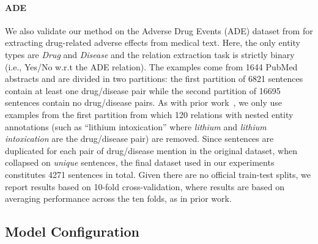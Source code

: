 \documentclass{clv3}
\begin{document}
\paragraph{ADE} We also validate our method on the Adverse Drug Events (ADE) dataset from  for extracting drug-related adverse effects from medical text. Here, the only entity types are \emph{Drug} and \emph{Disease} and the relation extraction task is strictly binary (i.e., Yes/No w.r.t the ADE relation). The examples come from 1644 PubMed abstracts and are divided in two partitions: the first partition of 6821 sentences contain at least one drug/disease pair while the second partition of 16695 sentences contain no drug/disease pairs. As with prior work~\cite{li2016joint,li2017neural,bekoulis2018join,bekoulis2018adversarial}, we  only use examples from the first partition from which  120 relations with nested entity annotations (such as ``lithium intoxication'' where \emph{lithium} and \emph{lithium intoxication} are the drug/disease pair) are removed. 
Since sentences are duplicated for each pair of drug/disease mention in the original dataset, when collapsed on \emph{unique} sentences, the final dataset used in our experiments constitutes 4271 sentences in total. 
Given there are no official train-test splits, we report results based on 10-fold cross-validation, where results are based on averaging performance across the ten folds, as in prior work.

\subsection{Model Configuration}
 
\end{document}
